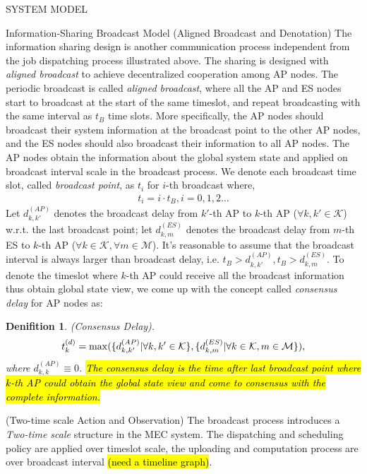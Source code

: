 \documentclass[10pt, conference, letterpaper]{IEEEtran}
\newtheorem{definition}{Denifition}
\DeclarePairedDelimiter{\set}{\{}{\}}
\newcommand{\apSet}{\mathcal{K}}
\newcommand{\esSet}{\mathcal{M}}
\begin{document}
\begin{section}{SYSTEM MODEL}
        \begin{subsection}{Information-Sharing Broadcast Model}
            (Aligned Broadcast and Denotation)
            The information sharing design is another communication process independent from the job dispatching process illustrated above. The sharing is designed with \emph{aligned broadcast} to achieve decentralized cooperation among AP nodes.
            The periodic broadcast is called \emph{aligned broadcast}, where all the AP and ES nodes start to broadcast at the start of the same timeslot, and repeat broadcasting with the same interval as $t_B$ time slots. More specifically, the AP nodes should broadcast their system information at the broadcast point to the other AP nodes, and the ES nodes should also broadcast their information to all AP nodes.
            The AP nodes obtain the information about the global system state and applied on broadcast interval scale in the broadcast process. We denote each broadcast time slot, called \emph{broadcast point}, as $t_i$ for $i$-th broadcast where,
            \begin{align}
                t_i = i \cdot t_B, i=0,1,2\dots
            \end{align} 
            Let $d^{(AP)}_{k,k'}$ denotes the broadcast delay from $k'$-th AP to $k$-th AP ($\forall k,k'\in\apSet$) w.r.t. the last broadcast point; let $d^{(ES)}_{k,m}$ denotes the broadcast delay from $m$-th ES to $k$-th AP ($\forall k\in\apSet,\forall m\in\esSet$). It's reasonable to assume that the broadcast interval is always larger than broadcast delay, i.e. $t_B > d^{(AP)}_{k,k'}, t_B > d^{(ES)}_{k,m}$. To denote the timeslot where $k$-th AP could receive all the broadcast information thus obtain global state view, we come up with the concept called \emph{consensus delay} for AP nodes as:
            \begin{definition}
                (Consensus Delay).
                \begin{align}
                    t^{(d)}_k = \max(\set{d^{(AP)}_{k,k'}|\forall k,k'\in\apSet}, \set{d^{(ES)}_{k,m}|\forall k\in\apSet,m\in\esSet}),
                \end{align}
                where $d^{(AP)}_{k,k} \equiv 0$. \hl{The consensus delay is the time after last broadcast point where $k$-th AP could obtain the global state view and come to consensus with the complete information.}
            \end{definition}

            (Two-time scale Action and Observation)
            The broadcast process introduces a \emph{Two-time scale} structure in the MEC system. The dispatching and scheduling policy are applied over timeslot scale, the uploading and computation process are over broadcast interval \hl{(need a timeline graph)}.
            

\end{subsection}
\end{section}
\end{document}
